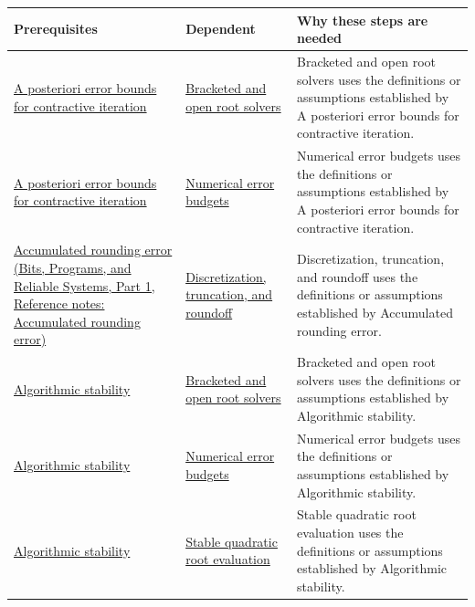 {\def\LTcaptype{none} %
\begin{longtable}[]{@{}
  >{\raggedright\arraybackslash}p{}
  >{\raggedright\arraybackslash}p{}
  >{\raggedright\arraybackslash}p{}@{}}
\toprule\noalign{}
\begin{minipage}[b]{\linewidth}\raggedright
Prerequisites
\end{minipage} & \begin{minipage}[b]{\linewidth}\raggedright
Dependent
\end{minipage} & \begin{minipage}[b]{\linewidth}\raggedright
Why these steps are needed
\end{minipage} \\
\midrule\noalign{}
\endhead
\bottomrule\noalign{}
\endlastfoot
\hyperref[appendix-d83b0ad1be7f]{A posteriori error bounds for contractive iteration} & \hyperref[appendix-f63eb850796d]{Bracketed and open root solvers} & Bracketed and open root solvers uses the definitions or assumptions established by A posteriori error bounds for contractive iteration. \\
\hyperref[appendix-d83b0ad1be7f]{A posteriori error bounds for contractive iteration} & \hyperref[appendix-31b8c295e05f]{Numerical error budgets} & Numerical error budgets uses the definitions or assumptions established by A posteriori error bounds for contractive iteration. \\
\href{../01-Bits-Programs-and-Reliable-Systems-P01/main.pdf\#appendix-f82e270791c8}{Accumulated rounding error (Bits, Programs, and Reliable Systems, Part 1, Reference notes: Accumulated rounding error)} & \hyperref[appendix-6b0648b2b8e8]{Discretization, truncation, and roundoff} & Discretization, truncation, and roundoff uses the definitions or assumptions established by Accumulated rounding error. \\
\hyperref[appendix-aa2bf0d79639]{Algorithmic stability} & \hyperref[appendix-f63eb850796d]{Bracketed and open root solvers} & Bracketed and open root solvers uses the definitions or assumptions established by Algorithmic stability. \\
\hyperref[appendix-aa2bf0d79639]{Algorithmic stability} & \hyperref[appendix-31b8c295e05f]{Numerical error budgets} & Numerical error budgets uses the definitions or assumptions established by Algorithmic stability. \\
\hyperref[appendix-aa2bf0d79639]{Algorithmic stability} & \hyperref[appendix-b9afba7f63e5]{Stable quadratic root evaluation} & Stable quadratic root evaluation uses the definitions or assumptions established by Algorithmic stability. \\

\end{longtable}}
